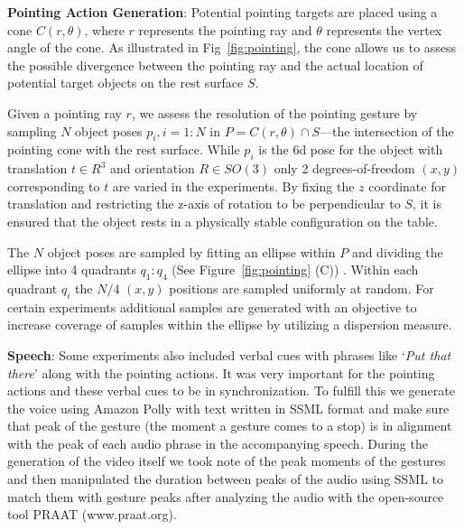 

\noindent\textbf{Pointing Action Generation}: Potential pointing targets are placed using a cone $C(r, \theta)$, where $r$ represents the pointing ray and $\theta$ represents the vertex angle of the cone. As illustrated in Fig~\ref{fig:pointing}, the cone allows us to assess the possible divergence between the pointing ray and the actual location of potential target objects on the rest surface $S$. 

Given a pointing ray $r$, we assess the resolution of the pointing gesture by sampling $N$ object poses $p_i, i=1:N$ in $P=C(r, \theta) \cap S$---the intersection of the pointing cone with the rest surface.  While $p_i$ is the 6d pose for the object with translation $t \in R^3$ and orientation $R \in SO(3)$ only 2  degrees-of-freedom $(x, y)$ corresponding to $t$ are varied in the experiments. By fixing the $z$ coordinate for translation and restricting the z-axis of rotation to be perpendicular to $S$, it is ensured that the object rests in a physically stable configuration on the table.

The $N$ object poses are sampled by fitting an ellipse within $P$ and dividing the ellipse into 4 quadrants $q_1:q_4$ (See Figure~\ref{fig:pointing} (C)) . Within each quadrant $q_i$ the $N/4$ $(x,y)$ positions are sampled uniformly at random. For certain experiments additional samples are generated with an objective to increase coverage of samples within the ellipse by utilizing a dispersion measure.



\noindent\textbf{Speech}: Some experiments also included verbal cues with phrases like `\textit{Put that there}' along with the pointing actions. It was very important for the pointing actions and these verbal cues to be in synchronization. To fulfill this we generate the voice using Amazon Polly with text written in SSML format and make sure that peak of the gesture (the moment a gesture comes to a stop) is in alignment with the peak of each audio phrase in the accompanying speech. During the generation of the video itself we took note of the peak moments of the gestures and then manipulated the duration between peaks of the audio using SSML to match them with gesture peaks after analyzing the audio with the open-source tool PRAAT (www.praat.org).




